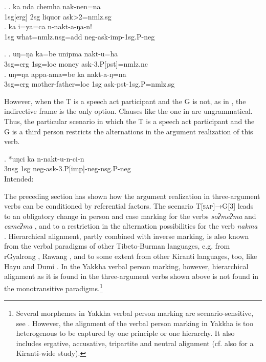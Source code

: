 	 \ex. \ag.  ka nda chemha nak-nen=na\\
	{\sc 1sg[erg]} 	 {\sc 2sg}  liquor ask{>2=nmlz.sg}	\\
	 \bg. ka i=ya=ca n-nakt-a-ŋa-n!\\ 
	{\sc 1sg}  what{\sc =nmlz.nsg=add} {\sc neg-}ask{\sc -imp-1sg.P-neg}		\\ 
	    
	
\ex. \ag. uŋ=ŋa ka=be unipma nakt-u=ha\\
		{\sc 3sg=erg} {\sc 1sg=loc}  money   ask{\sc -3.P[pst]=nmlz.nc}	\\
 	\bg. uŋ=ŋa appa-ama=be ka nakt-a-ŋ=na\\
	{\sc 3sg=erg} mother-father{\sc =loc}  {\sc 1sg}	ask{\sc -pst-1sg.P=nmlz.sg}	\\

However, when the T is a speech act participant and the G is not, as in \Last[b], the indirective frame is the only option. Clauses like the one in \Next are ungrammatical. Thus, the particular scenario in which the T is a speech act participant and the G is a third person restricts the alternations in the argument realization of this verb.

\exg. *uŋci ka n-nakt-u-n-ci-n\\
	{\sc 3nsg} {\sc 1sg} {\sc neg-}ask{\sc -3.P[imp]-neg-nsg.P-neg}\\
	Intended:   


The preceding section has shown how the argument realization in three-argument verbs can be conditioned by referential factors. The scenario  T[\textsc{sap}]→G[3]  leads to an obligatory change in  person and case marking for the verbs \emph{soʔmeʔma}  and \emph{cameʔma} , and to a restriction in the alternation possibilities for the verb \emph{nakma} . Hierarchical alignment, partly combined with inverse marking, is also known from the verbal paradigms of other Tibeto-Burman languages, e.g. from rGyalrong \citep{Nagano1984A-historical}, Rawang \citep{LaPolla2007Hierarchical}, and to some extent from other Kiranti languages, too, like Hayu and Dumi \citep{Michailovsky2003Hayu, Driem1993A-grammar}. In the Yakkha verbal person marking, however, hierarchical alignment as it is found in the three-argument verbs shown above is not found in the monotransitive paradigms.\footnote{Several morphemes in Yakkha verbal person marking are scenario-sensitive, see . However, the alignment of the verbal person marking in Yakkha is too heterogenous to be captured by one principle or one hierarchy. It also includes ergative, accusative, tripartite and neutral alignment (cf. also \citet{Witzlacketal2011_Decomposing} for a Kiranti-wide study).}


 